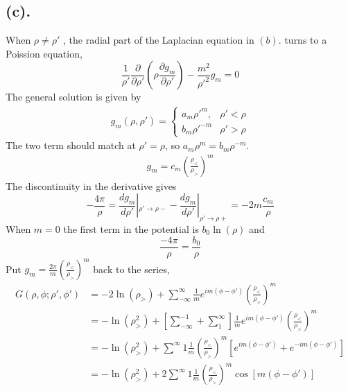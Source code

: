 \documentclass[notitlepage]{revtex4-1}
\newcommand{\pd}[2]{\frac{\partial#1}{\partial#2}}
\begin{document}
\subsection*{(c).}
When $\rho\neq\rho'$ , the radial part of the Laplacian equation in $(b).$ turns to a Poission equation,
\[ \frac{1}{\rho'}\pd{}{\rho'}(\rho\pd{g_m}{\rho'})-\frac{m^2}{\rho'^2}g_m=0 \]
The general solution is given by
\begin{align*}
  g_m(\rho,\rho')=
  \begin{cases}
    a_m\rho'^m, & \rho'<\rho\\
    b_m\rho'^{-m} & \rho'>\rho
  \end{cases}
\end{align*}
The two term should match at $\rho'=\rho$, so $a_m\rho^m=b_m\rho^{-m}$. 
\begin{align*}
  g_m=c_m(\frac{\rho_<}{\rho_>})^m
\end{align*}
The discontinuity in the derivative gives
\[-\frac{4\pi}{\rho}=\frac{d g_m}{d \rho'}|_{\rho'\rightarrow\rho-}-\frac{d g_m}{d \rho'}|_{\rho'\rightarrow\rho+}=-2m\frac{c_m}{\rho}
\]
When $m=0$ the first term in the potential is $b_0\ln(\rho)$ and
\[\frac{-4\pi}{\rho}=\frac{b_0}{\rho}\]
Put $g_m=\frac{2\pi}{m}(\frac{\rho_<}{\rho_>})^m$ back to the series,
\begin{align*}
  G(\rho,\phi;\rho',\phi')&=-2\ln(\rho_>)+\sum^{\infty}_{-\infty}\frac{1}{m}e^{im(\phi-\phi')}(\frac{\rho_<}{\rho_>})^m\\
                          &=-\ln(\rho_>^2)+[\sum^{-1}_{-\infty}+\sum^{\infty}_{1}]\frac{1}{m}e^{im(\phi-\phi')}(\frac{\rho_<}{\rho_>})^m\\
                          &=-\ln(\rho_>^2)+\sum^{\infty}{1}\frac{1}{m}(\frac{\rho_<}{\rho_>})^m[e^{im(\phi-\phi')}+e^{-im(\phi-\phi')}]\\
                          &=-\ln(\rho_>^2)+2\sum^{\infty}{1}\frac{1}{m}(\frac{\rho_<}{\rho_>})^m\cos[m(\phi-\phi')]
\end{align*}
\\~\\
\\~\\
\\~\\
\\~\\
\\~\\
\\~\\
\\~\\
\\~\\
\\~\\
\\~\\
\end{document}
